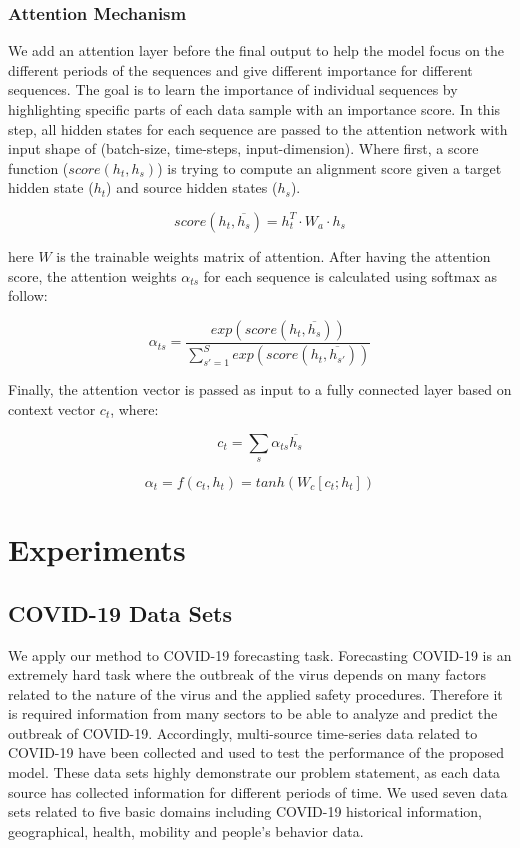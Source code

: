 \documentclass[conference]{IEEEtran}
\begin{document}
 
\subsubsection {Attention Mechanism }
We add an attention layer before the final output to help the model focus on the different periods of the sequences and give different importance for different sequences. The goal is to learn the importance of individual sequences by highlighting specific parts of each data sample with an importance score. In this step, all hidden states for each sequence are passed to the attention network with input shape of  (batch-size, time-steps, input-dimension). Where first, a score function ($ score(h_{t}, h_{s})$) is trying to compute an alignment score given a target hidden state ($h_t$) and source hidden states ($h_s$).

 \begin{equation}
 score (h_{t},\overline{h_{s}})= h_{t}^{T}\cdot  W_{a} \cdot h_{s}
 \end{equation}
 
here $W$ is the trainable weights matrix of attention. After having the attention score, the attention weights $ \alpha _{ts} $ for each sequence is calculated using softmax as follow:

\begin{equation}
\alpha _{ts} = \frac{exp (score (h_{t},\overline{h_{s}}))}{\sum_{{s}'=1}^{S}exp (score (h_{t},\overline{h_{s'}}))}
\end{equation}

Finally, the attention vector is passed as input to a fully connected layer based on context vector  $c_{t}$, where:

\begin{equation}
c_{t} = \sum_{s} \alpha _{ts}\overline{h_{s}}
\end{equation}

\begin{equation}
\alpha _{t} = f(c_{t}, h_{t}) = tanh(W_{c}[c_{t};h_{t}])
\end{equation}


\section{Experiments}

\subsection{COVID-19 Data Sets}
We apply our method to COVID-19 forecasting task. Forecasting COVID-19 is an extremely hard task where the outbreak of the virus depends on many factors related to the nature of the virus and the applied safety procedures. Therefore it is required information from many sectors to be able to analyze and predict the outbreak of COVID-19.  Accordingly,  multi-source time-series data related to COVID-19 have been collected and used to test the performance of the proposed model. These data sets highly demonstrate our problem statement, as each data source has collected information for different periods of time. We used seven data sets related to five basic domains including COVID-19 historical information, geographical, health, mobility and people's behavior data.
\end{document}

